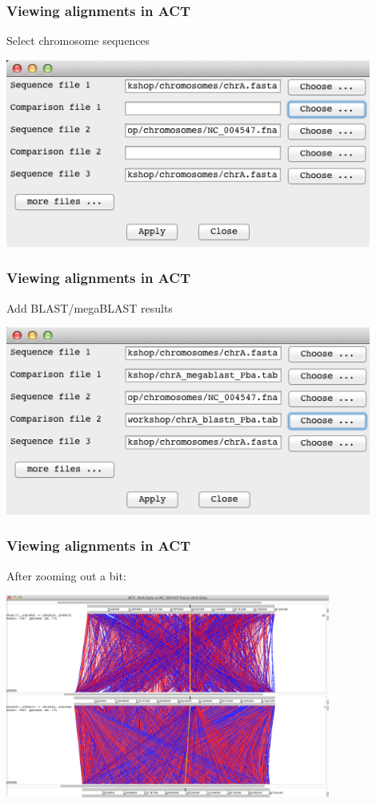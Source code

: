 \documentclass[table]{beamer}
\begin{document}
    \begin{frame}
      \frametitle{Viewing alignments in ACT}
      Select chromosome sequences
      \begin{center}
        \includegraphics[width=0.9\textwidth]{images/act_wgs4}
      \end{center}
    \end{frame}

    \begin{frame}
      \frametitle{Viewing alignments in ACT}
      Add BLAST/megaBLAST results
      \begin{center}
        \includegraphics[width=0.9\textwidth]{images/act_wgs5}
      \end{center}
    \end{frame}

    \begin{frame}
      \frametitle{Viewing alignments in ACT}
      After zooming out a bit:
      \begin{center}
        \includegraphics[width=0.8\textwidth]{images/act_wgs6}
      \end{center}
    \end{frame}
\end{document}
